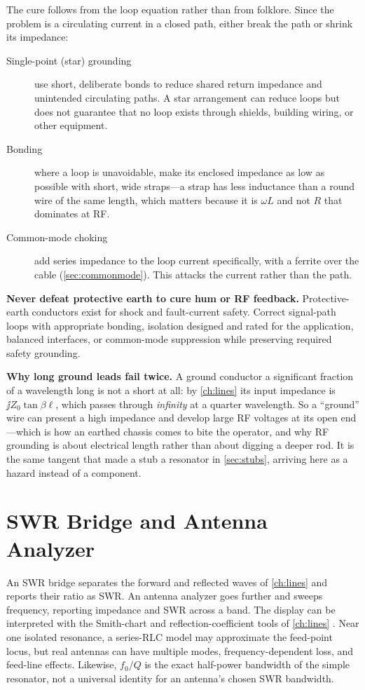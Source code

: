 The cure follows from the loop equation rather than from folklore. Since the problem
is a circulating current in a closed path, either break the path or shrink its
impedance:
\begin{description}
\item[Single-point (star) grounding] use short, deliberate bonds to reduce shared
return impedance and unintended circulating paths. A star arrangement can reduce
loops but does not guarantee that no loop exists through shields, building wiring,
or other equipment.
\item[Bonding] where a loop is unavoidable, make its enclosed impedance as low as
possible with short, wide straps---a strap has less inductance than a round wire of
the same length, which matters because it is \(\omega L\) and not \(R\) that
dominates at RF.
\item[Common-mode choking] add series impedance to the loop current specifically,
with a ferrite over the cable (\cref{sec:commonmode}). This attacks the current
rather than the path.
\end{description}

\begin{mistakebox}
\textbf{Never defeat protective earth to cure hum or RF feedback.} Protective-earth
conductors exist for shock and fault-current safety. Correct signal-path loops with
appropriate bonding, isolation designed and rated for the application, balanced
interfaces, or common-mode suppression while preserving required safety grounding.
\end{mistakebox}

\begin{physicalbox}
\textbf{Why long ground leads fail twice.} A ground conductor a significant
fraction of a wavelength long is not a short at all: by \cref{ch:lines} its input
impedance is \(\jj Z_0\tan\beta\ell\), which passes through \emph{infinity} at a
quarter wavelength. So a ``ground'' wire can present a high impedance and develop
large RF voltages at its open end---which is how an earthed chassis comes to bite
the operator, and why RF grounding is about electrical length rather than about
digging a deeper rod. It is the same tangent that made a stub a resonator in
\cref{sec:stubs}, arriving here as a hazard instead of a component.
\end{physicalbox}

\section{SWR Bridge and Antenna Analyzer}
An SWR bridge separates the forward and reflected waves of \cref{ch:lines} and reports
their ratio as SWR. An antenna analyzer goes further and sweeps frequency, reporting
impedance and SWR across a band. The display can be interpreted with the Smith-chart
and reflection-coefficient tools of \cref{ch:lines}
\cite[pp.~155--157]{free2022rfmicrowave}. Near one isolated resonance, a series-RLC
model may approximate the feed-point locus, but real antennas can have multiple modes,
frequency-dependent loss, and feed-line effects. Likewise, \(f_0/Q\) is the exact
half-power bandwidth of the simple resonator, not a universal identity for an antenna's
chosen SWR bandwidth.

